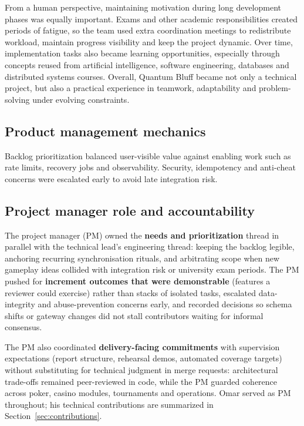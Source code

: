 \documentclass[11pt,a4paper]{article}
\begin{document}
From a human perspective, maintaining motivation during long development phases was equally important. Exams and other academic responsibilities created periods of fatigue, so the team used extra coordination meetings to redistribute workload, maintain progress visibility and keep the project dynamic. Over time, implementation tasks also became learning opportunities, especially through concepts reused from artificial intelligence, software engineering, databases and distributed systems courses. Overall, Quantum Bluff became not only a technical project, but also a practical experience in teamwork, adaptability and problem-solving under evolving constraints.

\subsection{Product management mechanics}

Backlog prioritization balanced user-visible value against enabling work such as rate limits, recovery jobs and observability. Security, idempotency and anti-cheat concerns were escalated early to avoid late integration risk.

\subsection{Project manager role and accountability}

The project manager (PM) owned the \textbf{needs and prioritization} thread in parallel with the technical lead's engineering thread: keeping the backlog legible, anchoring recurring synchronisation rituals, and arbitrating scope when new gameplay ideas collided with integration risk or university exam periods. The PM pushed for \textbf{increment outcomes that were demonstrable} (features a reviewer could exercise) rather than stacks of isolated tasks, escalated data-integrity and abuse-prevention concerns early, and recorded decisions so schema shifts or gateway changes did not stall contributors waiting for informal consensus.

The PM also coordinated \textbf{delivery-facing commitments} with supervision expectations (report structure, rehearsal demos, automated coverage targets) without substituting for technical judgment in merge requests: architectural trade-offs remained peer-reviewed in code, while the PM guarded coherence across poker, casino modules, tournaments and operations. Omar served as PM throughout; his technical contributions are summarized in Section~\ref{sec:contributions}.
\end{document}
